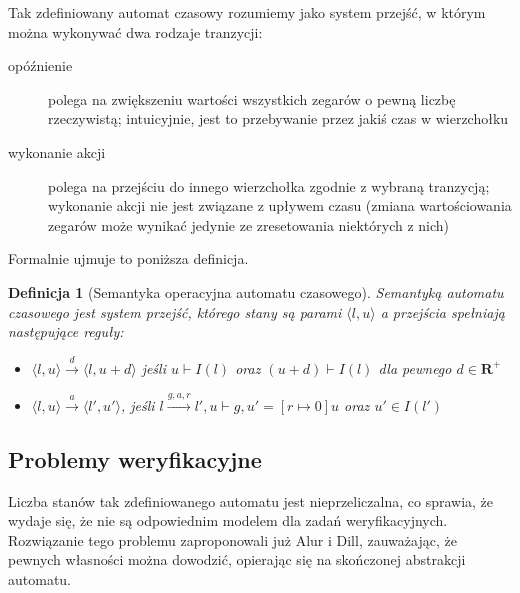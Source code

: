 \documentclass{pracamgr}
\newcommand{\pair}[2]{\langle #1, #2 \rangle}
\theoremstyle{plain}
\newtheorem{definition}{Definicja}
\begin{document}
Tak zdefiniowany automat czasowy rozumiemy jako
system przejść, w którym można wykonywać dwa rodzaje tranzycji:
\begin{description}
  \item[opóźnienie] polega na zwiększeniu wartości wszystkich zegarów
  o pewną liczbę rzeczywistą; intuicyjnie, jest to przebywanie przez
  jakiś czas w wierzchołku
  \item[wykonanie akcji] polega na przejściu do innego wierzchołka
  zgodnie z wybraną tranzycją; wykonanie akcji nie jest związane z
  upływem czasu (zmiana wartościowania zegarów może wynikać jedynie ze
  zresetowania niektórych z nich)
\end{description}
Formalnie ujmuje to poniższa definicja.
\begin{definition}[Semantyka operacyjna automatu czasowego] Semantyką
  automatu czasowego jest system przejść, którego stany są parami
$\langle l, u \rangle$ a przejścia spełniają następujące reguły:
  \begin{itemize}
    \item $\pair{l}{u} \stackrel{d}{\longrightarrow} \pair{l}{u+d}$
    jeśli $u \vdash I(l)$ oraz $(u+d) \vdash I(l)$ dla pewnego $d \in
    \mathbf{R}^{+}$
    \item $\pair{l}{u} \stackrel{a}{\longrightarrow} \pair{l'}{u'}$,
    jeśli $l \stackrel{g, a, r}{\longrightarrow} l', u \vdash g, u' =
    [r \mapsto 0]u$ oraz $u' \in I(l')$
  \end{itemize}
\end{definition}

\subsection{Problemy weryfikacyjne}

Liczba stanów tak zdefiniowanego automatu jest nieprzeliczalna, co
sprawia, że wydaje się, że nie są odpowiednim modelem dla zadań
weryfikacyjnych. Rozwiązanie tego problemu zaproponowali już Alur i
Dill\cite{alur-dill}, zauważając, że pewnych własności można dowodzić,
opierając się na skończonej abstrakcji automatu.
\end{document}
